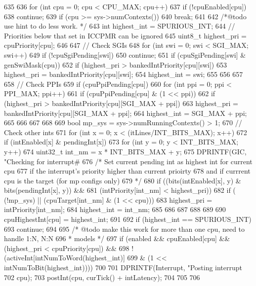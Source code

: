 \begin{DoxyCode}
635 {
636     for (int cpu = 0; cpu < CPU_MAX; cpu++) {
637         if (!cpuEnabled[cpu])
638             continue;
639         if (cpu >= sys->numContexts())
640             break;
641 
642         /*@todo use hint to do less work. */
643         int highest_int = SPURIOUS_INT;
644         // Priorities below that set in ICCPMR can be ignored
645         uint8_t highest_pri = cpuPriority[cpu];
646 
647         // Check SGIs
648         for (int swi = 0; swi < SGI_MAX; swi++) {
649             if (!cpuSgiPending[swi])
650                 continue;
651             if (cpuSgiPending[swi] & genSwiMask(cpu))
652                 if (highest_pri > bankedIntPriority[cpu][swi]) {
653                     highest_pri = bankedIntPriority[cpu][swi];
654                     highest_int = swi;
655                 }
656         }
657 
658         // Check PPIs
659         if (cpuPpiPending[cpu]) {
660         for (int ppi = 0; ppi < PPI_MAX; ppi++) {
661             if (cpuPpiPending[cpu] & (1 << ppi))
662                 if (highest_pri > bankedIntPriority[cpu][SGI_MAX + ppi]) {
663                     highest_pri = bankedIntPriority[cpu][SGI_MAX + ppi];
664                     highest_int = SGI_MAX + ppi;
665                 }
666             }
667         }
668 
669         bool mp_sys = sys->numRunningContexts() > 1;
670         // Check other ints
671         for (int x = 0; x < (itLines/INT_BITS_MAX); x++) {
672             if (intEnabled[x] & pendingInt[x]) {
673                 for (int y = 0; y < INT_BITS_MAX; y++) {
674                    uint32_t int_nm = x * INT_BITS_MAX + y;
675                    DPRINTF(GIC, "Checking for interrupt# %
676                     /* Set current pending int as highest int for current cpu
677                        if the interrupt's priority higher than current prioirty
678                        and if currrent cpu is the target (for mp configs only)
679                      */
680                     if ((bits(intEnabled[x], y) & bits(pendingInt[x], y)) &&
681                         (intPriority[int_nm] < highest_pri))
682                         if ( (!mp_sys) || (cpuTarget[int_nm] & (1 << cpu))) {
683                             highest_pri = intPriority[int_nm];
684                             highest_int = int_nm;
685                         }
686                 }
687             }
688         }
689 
690         cpuHighestInt[cpu] = highest_int;
691 
692         if (highest_int == SPURIOUS_INT)
693             continue;
694 
695         /* @todo make this work for more than one cpu, need to handle 1:N, N:N
696          * models */
697         if (enabled && cpuEnabled[cpu] && (highest_pri < cpuPriority[cpu]) &&
698             !(activeInt[intNumToWord(highest_int)]
699             & (1 << intNumToBit(highest_int)))) {
700 
701             DPRINTF(Interrupt, "Posting interrupt %
702                     cpu);
703             postInt(cpu, curTick() + intLatency);
704         }
705     }
706 }
\end{DoxyCode}
